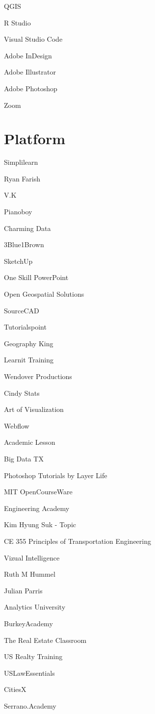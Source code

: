 \documentclass[
]{book}
\begin{document}
QGIS

R Studio

Visual Studio Code

Adobe InDesign

Adobe Illustrator

Adobe Photoshop

Zoom

\hypertarget{platform}{%
\section{Platform}\label{platform}}

Simplilearn

Ryan Farish

V.K

Pianoboy

Charming Data

3Blue1Brown

SketchUp

One Skill PowerPoint

Open Geospatial Solutions

SourceCAD

Tutorialspoint

Geography King

Learnit Training

Wendover Productions

Cindy Stats

Art of Visualization

Webflow

Academic Lesson

Big Data TX

Photoshop Tutorials by Layer Life

MIT OpenCourseWare

Engineering Academy

Kim Hyung Suk - Topic

CE 355 Principles of Transportation Engineering

Vizual Intelligence

Ruth M Hummel

Julian Parris

Analytics University

BurkeyAcademy

The Real Estate Classroom

US Realty Training

USLawEssentials

CitiesX

Serrano.Academy
\end{document}
